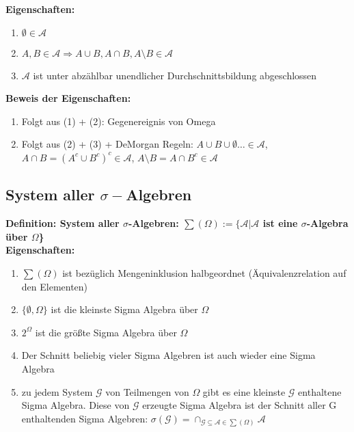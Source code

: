 \documentclass[a4paper,11pt]{scrartcl}
\begin{document}
\textbf{Eigenschaften:}
\begin{enumerate}
    \item $\emptyset \in \mathcal{A}$
    \item $A,B \in \mathcal{A} \Rightarrow A \cup B, A \cap B, A \setminus B \in \mathcal{A}$
    \item $\mathcal{A}$ ist unter abzählbar unendlicher Durchschnittsbildung abgeschlossen
\end{enumerate}

\textbf{Beweis der Eigenschaften:}
\begin{enumerate}
    \item Folgt aus (1) + (2): Gegenereignis von Omega
    \item Folgt aus (2) + (3) + DeMorgan Regeln: $A \cup B \cup \emptyset \dots \in \mathcal{A}$, $ A \cap B = (A^c \cup B^c)^c \in \mathcal{A}$, $A \setminus B = A \cap B^c \in \mathcal{A}$
\end{enumerate}

\subsection{System aller $\sigma-$Algebren}

\textbf{Definition: System aller $\sigma$-Algebren: $\sum (\Omega) := \{\mathcal{A} | \mathcal{A}$ ist eine $\sigma$-Algebra über $\Omega$\}} \\

\textbf{Eigenschaften:}
\begin{enumerate}
    \item $\sum (\Omega)$ ist bezüglich Mengeninklusion halbgeordnet (Äquivalenzrelation auf den Elementen)
    \item $\{\emptyset,\Omega\}$ ist die kleinste Sigma Algebra über $\Omega$
    \item $2^\Omega$ ist die größte Sigma Algebra über $\Omega$
    \item Der Schnitt beliebig vieler Sigma Algebren ist auch wieder eine Sigma Algebra
    \item zu jedem System $\mathcal{G}$ von Teilmengen von $\Omega$ gibt es eine kleinste $\mathcal{G}$ enthaltene Sigma Algebra. Diese von $\mathcal{G}$ erzeugte Sigma Algebra ist der Schnitt aller G enthaltenden Sigma Algebren: $\sigma (\mathcal{G}) = \cap_{\mathcal{G} \subseteq \mathcal{A} \in \sum (\Omega)} \mathcal{A}$
\end{enumerate}
\end{document}
